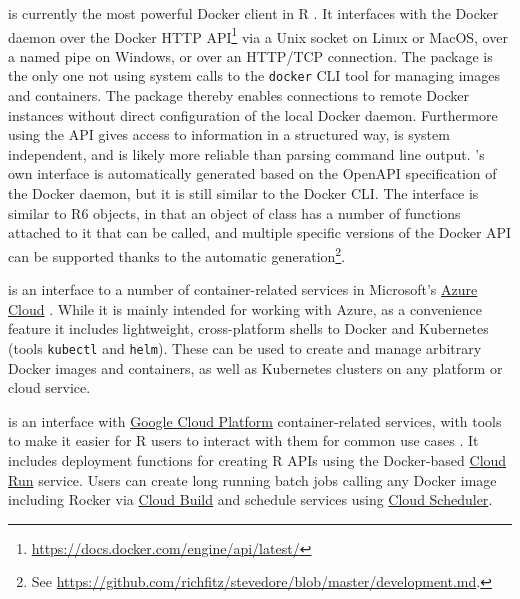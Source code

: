 \textbf{} is currently the most powerful Docker
client in R \citep{cran_stevedore}. It interfaces with the Docker daemon
over the Docker HTTP
API\footnote{\href{https://docs.docker.com/engine/api/latest/}{https://docs.docker.com/engine/api/latest/}}
via a Unix socket on Linux or MacOS, over a named pipe on Windows, or
over an HTTP/TCP connection. The package is the only one not using
system calls to the \texttt{docker} CLI tool for managing images and
containers. The package thereby enables connections to remote Docker
instances without direct configuration of the local Docker daemon.
Furthermore using the API gives access to information in a structured
way, is system independent, and is likely more reliable than parsing
command line output. 's own interface is automatically
generated based on the OpenAPI specification of the Docker daemon, but
it is still similar to the Docker CLI. The interface is similar to R6
objects, in that an object of class  has a
number of functions attached to it that can be called, and multiple
specific versions of the Docker API can be supported thanks to the
automatic
generation\footnote{See \href{https://github.com/richfitz/stevedore/blob/master/development.md}{https://github.com/richfitz/stevedore/blob/master/development.md}.}.

\textbf{} is an interface to a number of
container-related services in Microsoft's
\href{https://azure.microsoft.com/}{Azure Cloud}
\citep{AzureContainers_2019}. While it is mainly intended for working
with Azure, as a convenience feature it includes lightweight,
cross-platform shells to Docker and Kubernetes (tools \texttt{kubectl}
and \texttt{helm}). These can be used to create and manage arbitrary
Docker images and containers, as well as Kubernetes clusters on any
platform or cloud service.

\textbf{} is an interface with
\href{https://cloud.google.com/}{Google Cloud Platform}
container-related services, with tools to make it easier for R users to
interact with them for common use cases \citep{cran:googleCloudRunner}.
It includes deployment functions for creating R APIs using the
Docker-based \href{https://cloud.run}{Cloud Run} service. Users can
create long running batch jobs calling any Docker image including Rocker
via \href{https://cloud.google.com/cloud-build/}{Cloud Build} and
schedule services using \href{https://cloud.google.com/scheduler/}{Cloud
Scheduler}.

